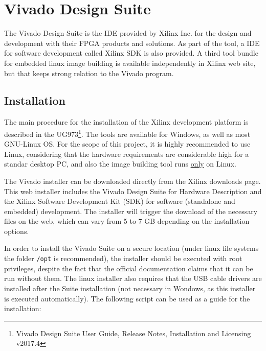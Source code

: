 
\chapter{Vivado Design Suite}

The Vivado Design Suite is the IDE provided by Xilinx Inc. for the design and development with their FPGA products and solutions. As part of the tool, a IDE for software development called Xilinx SDK is also provided. A third tool bundle for embedded linux image building is available independently in Xilinx web site, but that keeps strong relation to the Vivado program.

\section{Installation}

The main procedure for the installation of the Xilinx development platform is described in the UG973\footnote{Vivado Design Suite User Guide, Release Notes, Installation and Licensing v2017.4}. The tools are available for Windows, as well as most GNU-Linux OS. For the scope of this project, it is highly recommended to use Linux, considering that the hardware requirements are considerable high for a standar desktop PC, and also the image building tool runs \underline{only} on Linux.

The Vivado installer can be downloaded directly from the Xilinx downloads page. This web installer includes the Vivado Design Suite for Hardware Description and the Xilinx Software Development Kit (SDK) for software (standalone and embedded) development. The installer will trigger the download of the necessary files on the web, which can vary from 5 to 7 GB depending on the installation options.

In order to install the Vivado Suite on a secure location (under linux file systems the folder \texttt{/opt} is recommended), the installer should be executed with root privileges, despite the fact that the official documentation claims that it can be run without them. The linux installer also requires that the USB cable drivers are installed after the Suite installation (not necessary in Wondows, as this installer is executed automatically). The following script can be used as a guide for the installation:

